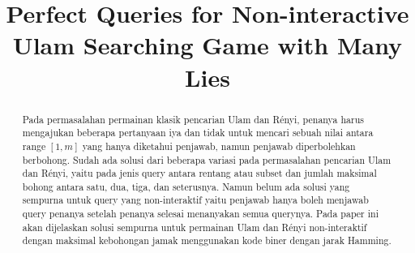 \documentclass[conference,compsoc]{IEEEtran}
\begin{document}
\title{Perfect Queries for Non-interactive\\Ulam Searching Game with Many Lies}


% 
\author{
}


\maketitle

\begin{abstract}
Pada permasalahan permainan klasik pencarian Ulam dan Rényi, penanya harus mengajukan beberapa pertanyaan iya dan tidak untuk mencari sebuah nilai antara range $[1,m]$ yang hanya diketahui penjawab, namun penjawab diperbolehkan berbohong. Sudah ada solusi dari beberapa variasi pada permasalahan pencarian Ulam dan Rényi, yaitu pada jenis query antara rentang atau subset dan jumlah maksimal bohong antara satu, dua, tiga, dan seterusnya. Namun belum ada solusi yang sempurna untuk query yang non-interaktif yaitu penjawab hanya boleh menjawab query penanya setelah penanya selesai menanyakan semua querynya. Pada paper ini akan dijelaskan solusi sempurna untuk permainan Ulam dan Rényi non-interaktif dengan maksimal kebohongan jamak menggunakan kode biner dengan jarak Hamming.
\end{abstract}
\end{document}
